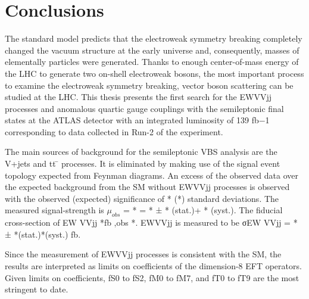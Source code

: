 \chapter{Conclusions}

The standard model predicts that the electroweak symmetry breaking completely changed the vacuum structure at the early universe and, consequently, masses of elementally particles were generated. Thanks to enough center-of-mass energy of the LHC to generate two on-shell electroweak bosons, the most important process to examine the electroweak symmetry breaking, vector boson scattering can be studied at the LHC. This thesis presents the first search for the EWVVjj processes and anomalous quartic gauge couplings with the semileptonic final states at the ATLAS detector with an integrated luminosity of 139 fb−1 corresponding to data collected in Run-2 of the experiment.

The main sources of background for the semileptonic VBS analysis are the V+jets and tt ̄ processes. It is eliminated by making use of the signal event topology expected from Feynman diagrams. 
An excess of the observed data over the expected background from the SM without EWVVjj processes is observed with the observed (expected) significance of * (*) standard deviations. The measured
signal-strength is $μ_{obs}$ = * = * ± * (stat.)+ * (syst.). The fiducial cross-section of EW VVjj *fb ,obs *.  EWVVjj is measured to be σEW VVjj = * ± *(stat.)*(syst.) fb.

Since the measurement of EWVVjj processes is consistent with the SM, the results are interpreted as limits on coefficients of the dimension-8 EFT operators. Given limits on coefficients, fS0 to fS2, fM0 to fM7, and fT0 to fT9 are the most stringent to date.
